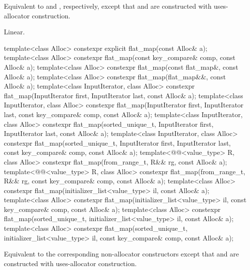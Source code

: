 \begin{itemdescr}
\pnum
\effects
Equivalent to  and
, respectively,
except that  and  are constructed
with uses-allocator construction.

\pnum
\complexity
Linear.
\end{itemdescr}

%
\begin{itemdecl}
template<class Alloc>
  constexpr explicit flat_map(const Alloc& a);
template<class Alloc>
  constexpr flat_map(const key_compare& comp, const Alloc& a);
template<class Alloc>
  constexpr flat_map(const flat_map&, const Alloc& a);
template<class Alloc>
  constexpr flat_map(flat_map&&, const Alloc& a);
template<class InputIterator, class Alloc>
  constexpr flat_map(InputIterator first, InputIterator last, const Alloc& a);
template<class InputIterator, class Alloc>
  constexpr flat_map(InputIterator first, InputIterator last, const key_compare& comp,
                     const Alloc& a);
template<class InputIterator, class Alloc>
  constexpr flat_map(sorted_unique_t, InputIterator first, InputIterator last, const Alloc& a);
template<class InputIterator, class Alloc>
  constexpr flat_map(sorted_unique_t, InputIterator first, InputIterator last,
                     const key_compare& comp, const Alloc& a);
template<@@<value_type> R, class Alloc>
  constexpr flat_map(from_range_t, R&& rg, const Alloc& a);
template<@@<value_type> R, class Alloc>
  constexpr flat_map(from_range_t, R&& rg, const key_compare& comp, const Alloc& a);
template<class Alloc>
  constexpr flat_map(initializer_list<value_type> il, const Alloc& a);
template<class Alloc>
  constexpr flat_map(initializer_list<value_type> il, const key_compare& comp, const Alloc& a);
template<class Alloc>
  constexpr flat_map(sorted_unique_t, initializer_list<value_type> il, const Alloc& a);
template<class Alloc>
  constexpr flat_map(sorted_unique_t, initializer_list<value_type> il,
                     const key_compare& comp, const Alloc& a);
\end{itemdecl}

\begin{itemdescr}
\pnum
\effects
Equivalent to the corresponding non-allocator constructors
except that  and  are constructed
with uses-allocator construction.
\end{itemdescr}

